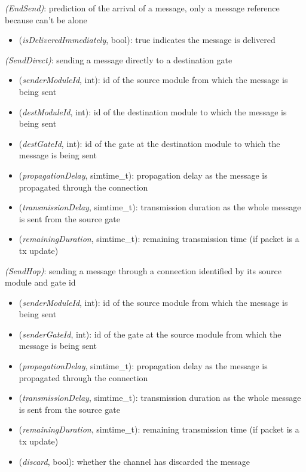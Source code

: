  \textit{(EndSend)}: prediction of the arrival of a message, only a message reference because can't be alone

\begin{itemize}
  \item {} (\textit{isDeliveredImmediately}, bool): true indicates the message is delivered
\end{itemize}

 \textit{(SendDirect)}: sending a message directly to a destination gate

\begin{itemize}
  \item {} (\textit{senderModuleId}, int): id of the source module from which the message is being sent
  \item {} (\textit{destModuleId}, int): id of the destination module to which the message is being sent
  \item {} (\textit{destGateId}, int): id of the gate at the destination module to which the message is being sent
  \item {} (\textit{propagationDelay}, simtime\_t): propagation delay as the message is propagated through the connection
  \item {} (\textit{transmissionDelay}, simtime\_t): transmission duration as the whole message is sent from the source gate
  \item {} (\textit{remainingDuration}, simtime\_t): remaining transmission time (if packet is a tx update)
\end{itemize}

 \textit{(SendHop)}: sending a message through a connection identified by its source module and gate id

\begin{itemize}
  \item {} (\textit{senderModuleId}, int): id of the source module from which the message is being sent
  \item {} (\textit{senderGateId}, int): id of the gate at the source module from which the message is being sent
  \item {} (\textit{propagationDelay}, simtime\_t): propagation delay as the message is propagated through the connection
  \item {} (\textit{transmissionDelay}, simtime\_t): transmission duration as the whole message is sent from the source gate
  \item {} (\textit{remainingDuration}, simtime\_t): remaining transmission time (if packet is a tx update)
  \item {} (\textit{discard}, bool): whether the channel has discarded the message
\end{itemize}

